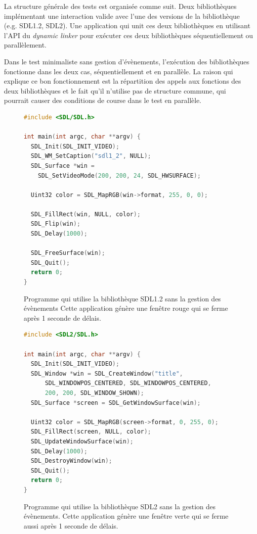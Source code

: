 La structure générale des tests est organisée comme suit. Deux bibliothèques implémentant
une interaction valide avec l'une des versions de la bibliothèque (e.g. SDL1.2, SDL2).
Une application qui unit ces deux bibliothèques en utilisant l'API du
\textit{dynamic linker} pour exécuter ces deux bibliothèques séquentiellement ou
parallèlement.


Dans le test minimaliste sans gestion d'évènements, l'exécution des bibliothèques
fonctionne dans les deux cas, séquentiellement et en parallèle. La raison qui
explique ce bon fonctionnement est la répartition des appels aux fonctions
des deux bibliothèques et le fait qu'il n'utilise pas de structure commune,
qui pourrait causer des conditions de course dans le test en parallèle.

\begin{center}
  \begin{figure}[ht]
\begin{lstlisting}[language=C,frame=single]
#include <SDL/SDL.h>

int main(int argc, char **argv) {
  SDL_Init(SDL_INIT_VIDEO);
  SDL_WM_SetCaption("sdl1_2", NULL);
  SDL_Surface *win =
    SDL_SetVideoMode(200, 200, 24, SDL_HWSURFACE);

  Uint32 color = SDL_MapRGB(win->format, 255, 0, 0);

  SDL_FillRect(win, NULL, color);
  SDL_Flip(win);
  SDL_Delay(1000);

  SDL_FreeSurface(win);
  SDL_Quit();
  return 0;
}
\end{lstlisting}
    \caption{Programme qui utilise la bibliothèque SDL1.2 sans la gestion des évènements
    Cette application génère une fenêtre rouge qui se ferme après 1 seconde de délais.}
  \end{figure}
\end{center}

\begin{center}
  \begin{figure}[ht]
\begin{lstlisting}[language=C,frame=single]
#include <SDL2/SDL.h>

int main(int argc, char **argv) {
  SDL_Init(SDL_INIT_VIDEO);
  SDL_Window *win = SDL_CreateWindow("title",
      SDL_WINDOWPOS_CENTERED, SDL_WINDOWPOS_CENTERED,
      200, 200, SDL_WINDOW_SHOWN);
  SDL_Surface *screen = SDL_GetWindowSurface(win);

  Uint32 color = SDL_MapRGB(screen->format, 0, 255, 0);
  SDL_FillRect(screen, NULL, color);
  SDL_UpdateWindowSurface(win);
  SDL_Delay(1000);
  SDL_DestroyWindow(win);
  SDL_Quit();
  return 0;
}
\end{lstlisting}
    \caption{Programme qui utilise la bibliothèque SDL2 sans la gestion des évènements.
    Cette application génère une fenêtre verte qui se ferme aussi après 1 seconde de délais.}
  \end{figure}
\end{center}

